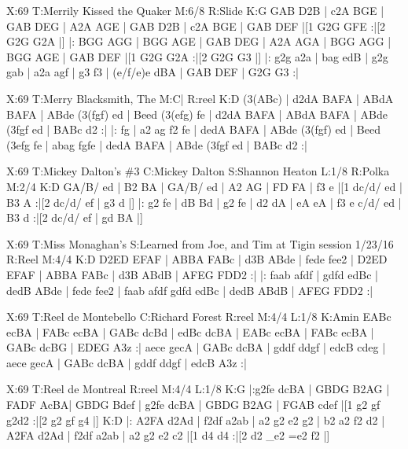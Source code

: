 \documentclass[letterpaper]{article}
\begin{document}
\begin{abc}[name]
X:69
T:Merrily Kissed the Quaker
M:6/8
R:Slide
K:G
GAB D2B | c2A BGE | GAB DEG | A2A AGE |
GAB D2B | c2A BGE | GAB DEF |[1 G2G GFE :|[2 G2G G2A |]
|: BGG AGG | BGG AGE | GAB DEG | A2A AGA |
BGG AGG | BGG AGE | GAB DEF |[1 G2G G2A :|[2 G2G G3 |]
|: g2g a2a | bag edB | g2g gab | a2a agf |
g3 f3 | (e/f/e)e dBA | GAB DEF | G2G G3 :|
\end{abc}

\begin{abc}[name]
X:69
T:Merry Blacksmith, The
M:C|
R:reel
K:D
(3(ABc) | d2dA BAFA | ABdA BAFA | ABde (3(fgf) ed | Beed (3(efg) fe |
d2dA BAFA | ABdA BAFA | ABde (3fgf ed | BABc d2 :|
|: fg | a2 ag f2 fe | dedA BAFA | ABde (3(fgf) ed | Beed (3efg fe |
abag fgfe | dedA BAFA |  ABde (3fgf ed | BABc d2 :|
\end{abc}

\begin{abc}[name]
X:69
T:Mickey Dalton's \#3
C:Mickey Dalton
S:Shannon Heaton
L:1/8
R:Polka
M:2/4
K:D
GA/B/ ed | B2 BA | GA/B/ ed | A2 AG |
FD FA | f3 e |[1 dc/d/ ed | B3 A :|[2 dc/d/ ef | g3 d |]
|: g2 fe | dB Bd | g2 fe | d2 dA |
eA eA | f3 e c/d/ ed | B3 d :|[2 dc/d/ ef | gd BA |]
\end{abc}

\begin{abc}[name]
X:69
T:Miss Monaghan's
S:Learned from Joe, and Tim at Tigin session 1/23/16
R:Reel
M:4/4
K:D
D2ED EFAF | ABBA FABc | d3B ABde | fede fee2 |
D2ED EFAF | ABBA FABc | d3B ABdB | AFEG FDD2 :|
|: faab afdf | gdfd edBc | dedB ABde | fede fee2 |
faab afdf gdfd edBc | dedB ABdB | AFEG FDD2 :|
\end{abc}

\begin{abc}[name]
X:69
T:Reel de Montebello   
C:Richard Forest
R:reel
M:4/4
L:1/8
K:Amin
EABc ecBA | FABc ecBA | GABc dcBd | edBc dcBA |
EABc ecBA | FABc ecBA | GABc dcBG | EDEG A3z :|
aece gecA | GABc dcBA | gddf ddgf | edcB cdeg |
aece gecA | GABc dcBA | gddf ddgf | edcB A3z :|
\end{abc}

\begin{abc}[name]
X:69
T:Reel de Montreal 
R:reel
M:4/4
L:1/8
K:G
|:g2fe dcBA | GBDG B2AG | FADF AcBA| GBDG Bdef |
g2fe dcBA | GBDG B2AG | FGAB cdef |[1 g2 gf g2d2 :|[2 g2 gf g4 |]
K:D
|: A2FA d2Ad | f2df a2ab | a2 g2 e2 g2 | b2 a2 f2 d2 |
A2FA d2Ad | f2df a2ab | a2 g2 e2 c2 |[1 d4 d4 :|[2 d2 _e2 =e2 f2 |]
\end{abc}
\end{document}
